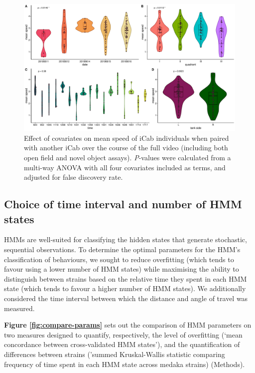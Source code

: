 \documentclass[
]{book}
\begin{document}
\begin{figure}
\includegraphics[width=1\linewidth]{figs/pilot/covariate_effects_no-split-by-assay} \caption{Effect of covariates on mean speed of iCab individuals when paired with another iCab over the course of the full video (including both open field and novel object assays). \emph{P}-values were calculated from a multi-way ANOVA with all four covariates included as terms, and adjusted for false discovery rate.}\label{fig:covariate-effects}
\end{figure}

\hypertarget{pilot-hmm-params}{%
\subsection{Choice of time interval and number of HMM states}\label{pilot-hmm-params}}

HMMs are well-suited for classifying the hidden states that generate stochastic, sequential observations. To determine the optimal parameters for the HMM's classification of behaviours, we sought to reduce overfitting (which tends to favour using a lower number of HMM states) while maximising the ability to distinguish between strains based on the relative time they spent in each HMM state (which tends to favour a higher number of HMM states). We additionally considered the time interval between which the distance and angle of travel was measured.

\textbf{Figure \ref{fig:compare-params}} sets out the comparison of HMM parameters on two measures designed to quantify, respectively, the level of overfitting (`mean concordance between cross-validated HMM states'), and the quantification of differences between strains ('summed Kruskal-Wallis statistic comparing frequency of time spent in each HMM state across medaka strains) (Methods).
\end{document}

